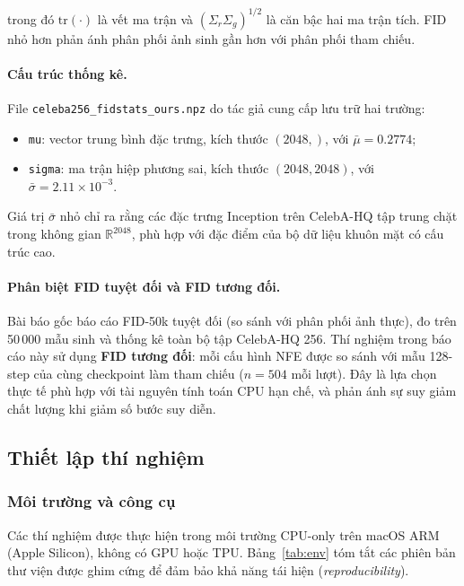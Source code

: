 \noindent trong đó $\mathrm{tr}(\cdot)$ là vết ma trận và $(\Sigma_r \Sigma_g)^{1/2}$ là căn bậc hai ma trận tích. FID nhỏ hơn phản ánh phân phối ảnh sinh gần hơn với phân phối tham chiếu.

\paragraph{Cấu trúc thống kê.}
File \texttt{celeba256\_fidstats\_ours.npz} do tác giả cung cấp lưu trữ hai trường:
\begin{itemize}
    \item \texttt{mu}: vector trung bình đặc trưng, kích thước $(2048,)$, với $\bar{\mu} = 0.2774$;
    \item \texttt{sigma}: ma trận hiệp phương sai, kích thước $(2048, 2048)$, với $\bar{\sigma} = 2.11 \times 10^{-3}$.
\end{itemize}

Giá trị $\bar{\sigma}$ nhỏ chỉ ra rằng các đặc trưng Inception trên CelebA-HQ tập trung chặt trong không gian $\mathbb{R}^{2048}$, phù hợp với đặc điểm của bộ dữ liệu khuôn mặt có cấu trúc cao.

\paragraph{Phân biệt FID tuyệt đối và FID tương đối.}
Bài báo gốc báo cáo FID-50k tuyệt đối (so sánh với phân phối ảnh thực), đo trên 50\,000 mẫu sinh và thống kê toàn bộ tập CelebA-HQ 256.
Thí nghiệm trong báo cáo này sử dụng \textbf{FID tương đối}: mỗi cấu hình NFE được so sánh với mẫu 128-step của cùng checkpoint làm tham chiếu ($n = 504$ mỗi lượt). Đây là lựa chọn thực tế phù hợp với tài nguyên tính toán CPU hạn chế, và phản ánh sự suy giảm chất lượng khi giảm số bước suy diễn.

\subsection{Thiết lập thí nghiệm}
\label{sec:setup}

\subsubsection{Môi trường và công cụ}

Các thí nghiệm được thực hiện trong môi trường CPU-only trên macOS ARM (Apple Silicon), không có GPU hoặc TPU. Bảng~\ref{tab:env} tóm tắt các phiên bản thư viện được ghim cứng để đảm bảo khả năng tái hiện (\textit{reproducibility}).

